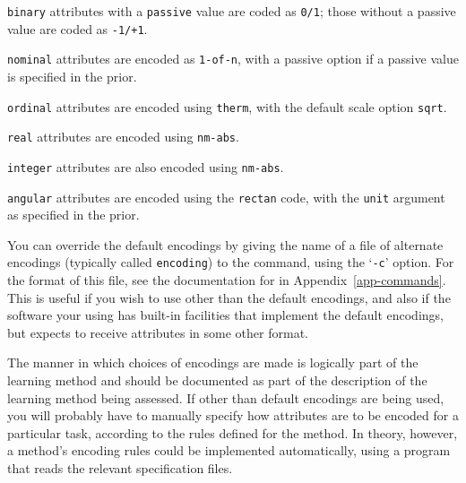 \begin{list}{}{\setlength{\labelwidth}{0.7in} \setlength{\labelsep}{0.1in}%
\setlength{\leftmargin}{1.1in}}

\item[{\tt binary}\hfill] attributes with a \texttt{passive} value 
are coded as \texttt{0/1}; those without a passive value are coded as
\texttt{-1/+1}.

\item[{\tt nominal}\hfill] attributes are encoded as {\tt 1-of-n},
with a passive option if a passive value is specified in the prior.

\item[{\tt ordinal}\hfill] attributes are encoded using {\tt therm},
with the default scale option \texttt{sqrt}.

\item[{\tt real}\hfill] attributes are encoded using {\tt nm-abs}.

\item[{\tt integer}\hfill] attributes are also encoded using {\tt nm-abs}.

\item[{\tt angular}\hfill] attributes are encoded using the {\tt rectan}
code, with the \texttt{unit} argument as specified in the prior.

\end{list}\vspace{-4pt}

You can override the default encodings by giving the name of a file of
alternate encodings (typically called \texttt{encoding}) to the
\mgendata{} command, using the `{\tt -c}' option.  For the format of
this file, see the documentation for \mgendata{} in
Appendix~\ref{app-commands}.  This is useful if you wish to use other
than the default encodings, and also if the software your using has
built-in facilities that implement the default encodings, but expects
to receive attributes in some other format.

The manner in which choices of encodings are made is logically part of
the learning method and should be documented as part of the
description of the learning method being assessed.  If other than
default encodings are being used, you will probably have to manually
specify how attributes are to be encoded for a particular task,
according to the rules defined for the method.  In theory, however, a
method's encoding rules could be implemented automatically, using a
program that reads the relevant specification files.


